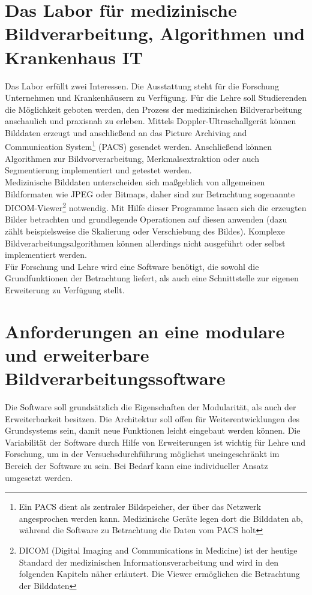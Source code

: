 \section{Das Labor für medizinische Bildverarbeitung, Algorithmen und Krankenhaus IT}
Das Labor erfüllt zwei Interessen. Die Ausstattung steht für die Forschung Unternehmen und Krankenhäusern zu Verfügung.
Für die Lehre soll Studierenden die Möglichkeit geboten werden, den Prozess der medizinischen Bildverarbeitung anschaulich und praxisnah zu erleben. Mittels Doppler-Ultraschallgerät können Bilddaten erzeugt und anschließend an das Picture Archiving and Communication System\footnote{Ein PACS dient als zentraler Bildspeicher, der über das Netzwerk angesprochen werden kann. Medizinische Geräte legen dort die Bilddaten ab, während die Software zu Betrachtung die Daten vom PACS holt} (PACS) gesendet werden. Anschließend können Algorithmen zur Bildvorverarbeitung, Merkmalsextraktion oder auch Segmentierung implementiert und getestet werden.\\
Medizinische Bilddaten unterscheiden sich maßgeblich von allgemeinen Bildformaten wie JPEG oder Bitmaps, daher sind zur Betrachtung sogenannte DICOM-Viewer\footnote{DICOM (Digital Imaging and Communications in Medicine) ist der heutige Standard der medizinischen Informationsverarbeitung und wird in den folgenden Kapiteln näher erläutert. Die Viewer ermöglichen die Betrachtung der Bilddaten} notwendig. Mit Hilfe dieser Programme lassen sich die erzeugten Bilder betrachten und grundlegende Operationen auf diesen anwenden (dazu zählt beispielsweise die Skalierung oder Verschiebung des Bildes). Komplexe Bildverarbeitungsalgorithmen können allerdings nicht ausgeführt oder selbst implementiert werden.\\
Für Forschung und Lehre wird eine Software benötigt, die sowohl die Grundfunktionen der Betrachtung liefert, als auch eine Schnittstelle zur eigenen Erweiterung zu Verfügung stellt.

\section{Anforderungen an eine modulare und erweiterbare Bildverarbeitungssoftware}

Die Software soll grundsätzlich die Eigenschaften der Modularität, als auch der Erweiterbarkeit besitzen. Die Architektur soll offen für Weiterentwicklungen des Grundsystems sein, damit neue Funktionen leicht eingebaut werden können. Die Variabilität der Software durch Hilfe von Erweiterungen ist wichtig für Lehre und Forschung, um in der Versuchsdurchführung möglichst uneingeschränkt im Bereich der Software zu sein. Bei Bedarf kann eine individueller Ansatz umgesetzt werden.\\
       

